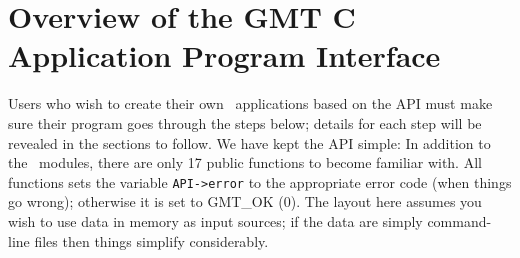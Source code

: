\documentclass[11pt]{report}
\begin{document}
\chapter{Overview of the GMT C Application Program Interface}

Users who wish to create their own \GMT\ applications based on the API
must make sure their program goes through the steps below; details
for each step will be revealed in the sections to follow.  We have kept the
API simple: In addition to the \GMT\ modules, there are only 17 public functions to become familiar with.
All functions sets the variable \texttt{API->error} to the appropriate error code (when things go wrong);
otherwise it is set to GMT\_OK (0).
The layout here assumes you wish to use data in memory as input sources; if the data are simply
command-line files then things simplify considerably.
\end{document}
